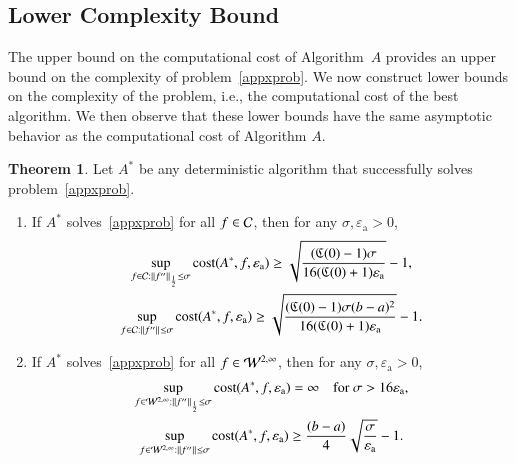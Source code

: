 \documentclass[review]{elsarticle}
\newcommand{\abstol}{\varepsilon_{\textrm{a}}}
\theoremstyle{definition}
\newtheorem{theorem}{Theorem}
\begin{document}
\subsection{Lower Complexity Bound} \label{subsec:appxcomp}

The upper bound on the computational cost of Algorithm~$A$ provides an upper bound on the complexity of problem~\eqref{appxprob}.  We now construct lower bounds on the complexity of the problem, i.e., the computational cost of the best algorithm.  We then observe that these lower bounds have the same asymptotic behavior as the computational cost of Algorithm $A$.

\begin{theorem}
	Let $A^*$ be any deterministic algorithm that successfully solves problem~\eqref{appxprob}.
	
	\begin{enumerate}
		\renewcommand{\labelenumi}{\roman{enumi}.}
		\item  If $A^*$ solves~\eqref{appxprob} for all $f \in \mathcal{C}$, then for any $\sigma, \abstol >0$,
		\begin{subequations} \label{lowbdC}
		\begin{gather}
		\sup_{f \in \cc : \norm[\frac12]{f''} \le\sigma } \cost(A^*,f,\abstol) \ge \sqrt{\frac{(\fC(0)-1)\sigma}{16(\fC(0)+1)\abstol}} -1, \label{lowbdChalf}\\
		\sup_{f \in \cc : \norm{f''} \le\sigma } \cost(A^*,f,\abstol) \ge \sqrt{\frac{(\fC(0)-1)\sigma(b-a)^2}{16(\fC(0)+1)\abstol}} -1 \label{lowbdCinf}.
		\end{gather}
		\end{subequations}
		
		\item If $A^*$ solves~\eqref{appxprob} for all $f \in  \mathcal{W}^{2,\infty}$, then for any $\sigma, \abstol >0$,
		\begin{subequations} \label{lowbdW}
		\begin{gather}
		\sup_{f \in \cw^{2,\infty} : \norm[\frac12]{f''} \le \sigma} \cost(A^*,f,\abstol) = \infty \quad \text{for } \sigma > 16 \abstol, \label{lowbdWhalf}\\
		\sup_{f \in \cw^{2,\infty} : \norm{f''} \le\sigma } \cost(A^*,f,\abstol) \ge \frac{(b-a)}{4} \sqrt{\frac{\sigma}{\abstol}} - 1.  \label{lowbdWinf}
		\end{gather}
		\end{subequations}
				
	\end{enumerate}
	\label{thm:A_cost}
\end{theorem}
\end{document}
